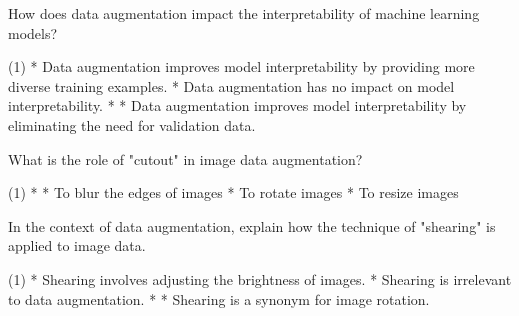 \documentclass[10pt]{extarticle}
\begin{document}
\begin{exercise}
    How does data augmentation impact the interpretability of machine learning models?
    \begin{choice} (1)
        * Data augmentation improves model interpretability by providing more diverse training examples.
        * Data augmentation has no impact on model interpretability.
        * 
        * Data augmentation improves model interpretability by eliminating the need for validation data.
    \end{choice}
\end{exercise}
\begin{solution}
\end{solution}

\begin{exercise}
    What is the role of "cutout" in image data augmentation?
    \begin{choice} (1)
        * 
        * To blur the edges of images
        * To rotate images
        * To resize images
    \end{choice}
\end{exercise}
\begin{solution}
\end{solution}

\begin{exercise}
    In the context of data augmentation, explain how the technique of "shearing" is applied to image data.
    \begin{choice} (1)
        * Shearing involves adjusting the brightness of images.
        * Shearing is irrelevant to data augmentation.
        * 
        * Shearing is a synonym for image rotation.
    \end{choice}
\end{exercise}
\begin{solution}
\end{solution}

\newpage
\begin{multicols*}{2}
    \printsolutions*
\end{multicols*}
\end{document}
